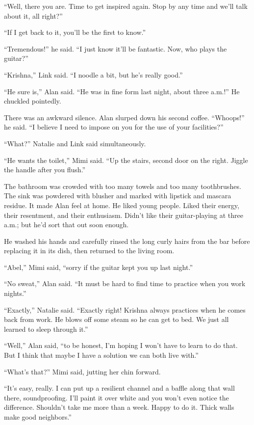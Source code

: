 ``Well, there you are.  Time to get inspired again.  Stop by any time
and we'll talk about it, all right?''

``If I get back to it, you'll be the first to know.''

``Tremendous!'' he said.  ``I just know it'll be fantastic.  Now, who
plays the guitar?''

``Krishna,'' Link said.  ``I noodle a bit, but he's really good.''

``He sure is,'' Alan said.  ``He was in fine form last night, about
three a.m.!'' He chuckled pointedly.

There was an awkward silence.  Alan slurped down his second coffee. 
``Whoops!'' he said.  ``I believe I need to impose on you for the use
of your facilities?''

``What?'' Natalie and Link said simultaneously.

``He wants the toilet,'' Mimi said.  ``Up the stairs, second door on
the right.  Jiggle the handle after you flush.''

The bathroom was crowded with too many towels and too many
toothbrushes.  The sink was powdered with blusher and marked with
lipstick and mascara residue.  It made Alan feel at home.  He liked
young people.  Liked their energy, their resentment, and their
enthusiasm.  Didn't like their guitar-playing at three a.m.; but he'd
sort that out soon enough.

He washed his hands and carefully rinsed the long curly hairs from the
bar before replacing it in its dish, then returned to the living room.

``Abel,'' Mimi said, ``sorry if the guitar kept you up last night.''

``No sweat,'' Alan said.  ``It must be hard to find time to practice
when you work nights.''

``Exactly,'' Natalie said.  ``Exactly right!  Krishna always practices
when he comes back from work.  He blows off some steam so he can get
to bed.  We just all learned to sleep through it.''

``Well,'' Alan said, ``to be honest, I'm hoping I won't have to learn
to do that.  But I think that maybe I have a solution we can both live
with.''

``What's that?'' Mimi said, jutting her chin forward.

``It's easy, really.  I can put up a resilient channel and a baffle
along that wall there, soundproofing.  I'll paint it over white and
you won't even notice the difference.  Shouldn't take me more than a
week.  Happy to do it.  Thick walls make good neighbors.''

